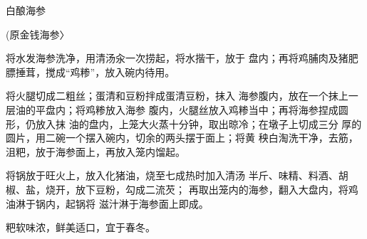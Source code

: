 \begin{recipe}{白酿海参}

(原金钱海参〉

\ingredients



\cooking

\step 	将水发海参洗净，用清汤汆一次捞起，将水揩干，放于 盘内；再将鸡脯肉及猪肥膘捶茸，搅成“鸡糁”，放入碗内待用。

\step 	将火腿切成二粗丝；蛋清和豆粉拌成蛋清豆粉，抹入 海参腹内，放在一个抹上一层油的平盘内；将鸡糁放入海参 腹内，火腿丝放入鸡糁当中；再将海参捏成圆形，仍放入抹 油的盘内，上笼大火蒸十分钟，取出晾冷；在墩子上切成三分 厚的圆片，用二碗一个摆入碗内，切余的两头摆于面上；将黄 秧白淘洗干净，去筋，沮粑，放于海参面上，再放入笼内馏起。

\step 	将锅放于旺火上，放入化猪油，烧至七成热时加入清汤 半斤、味精、料酒、胡椒、盐，烧开，放下豆粉，勾成二流芡； 再取出笼内的海参，翻入大盘内，将鸡油淋于锅内，起锅将 滋汁淋于海参面上即成。

\notes

粑软味浓，鲜美适口，宜于春冬。

\end{recipe}

